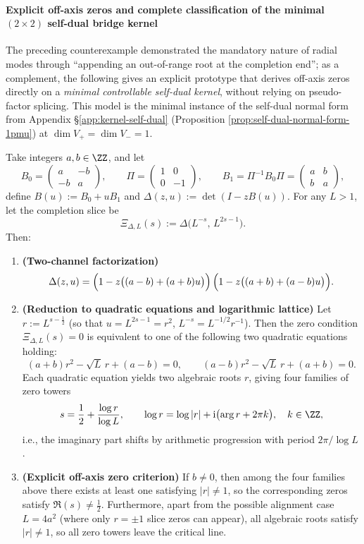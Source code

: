 \paragraph{Explicit off-axis zeros and complete classification of the minimal \texorpdfstring{$(2\times2)$}{(2x2)} self-dual bridge kernel}
The preceding counterexample demonstrated the mandatory nature of radial modes through ``appending an out-of-range root at the completion end'';
as a complement, the following gives an explicit prototype that derives off-axis zeros directly on a \emph{minimal controllable self-dual kernel}, without relying on pseudo-factor splicing.
This model is the minimal instance of the self-dual normal form from Appendix \S\ref{app:kernel-self-dual} (Proposition \ref{prop:self-dual-normal-form-1pmu}) at \(\dim V_+=\dim V_-=1\).

\begin{theorem}\label{thm:xi-2x2-selfdual-offcritical-template}
Take integers \(a,b\in\ZZ\), and let
\[
  B_0=\begin{pmatrix}a&-b\\-b&a\end{pmatrix},\qquad
  \Pi=\begin{pmatrix}1&0\\0&-1\end{pmatrix},\qquad
  B_1=\Pi^{-1}B_0\Pi=\begin{pmatrix}a&b\\b&a\end{pmatrix},
\]
define
\(
B(u):=B_0+uB_1
\)
and
\(
\Delta(z,u):=\det(I-zB(u))
\).
For any \(L>1\), let the completion slice be
\[
  \Xi_{\Delta,L}(s):=\Delta\!\bigl(L^{-s},\,L^{2s-1}\bigr).
\]
Then:
\begin{enumerate}
  \item \textbf{(Two-channel factorization)}
  \[
  \Delta(z,u)
  =\Bigl(1-z\bigl((a-b)+(a+b)u\bigr)\Bigr)\,
   \Bigl(1-z\bigl((a+b)+(a-b)u\bigr)\Bigr).
  \]
  \item \textbf{(Reduction to quadratic equations and logarithmic lattice)}
  Let \(r:=L^{s-\tfrac12}\) (so that \(u=L^{2s-1}=r^{2}\), \(L^{-s}=L^{-1/2}r^{-1}\)).
  Then the zero condition \(\Xi_{\Delta,L}(s)=0\) is equivalent to one of the following two quadratic equations holding:
  \[
  (a+b)r^2-\sqrt L\,r+(a-b)=0,
  \qquad
  (a-b)r^2-\sqrt L\,r+(a+b)=0.
  \]
  Each quadratic equation yields two algebraic roots \(r\), giving four families of zero towers
  \[
  s=\frac12+\frac{\log r}{\log L},
  \qquad
  \log r=\log|r|+\mathrm{i}\bigl(\arg r+2\pi k\bigr),\quad k\in\ZZ,
  \]
  i.e., the imaginary part shifts by arithmetic progression with period \(2\pi/\log L\).
  \item \textbf{(Explicit off-axis zero criterion)}
  If \(b\neq 0\), then among the four families above there exists at least one satisfying \(|r|\neq 1\), so the corresponding zeros satisfy \(\Re(s)\neq\tfrac12\).
  Furthermore, apart from the possible alignment case \(L=4a^2\) (where only \(r=\pm 1\) slice zeros can appear), all algebraic roots satisfy \(|r|\neq 1\), so all zero towers leave the critical line.
\end{enumerate}
\end{theorem}

